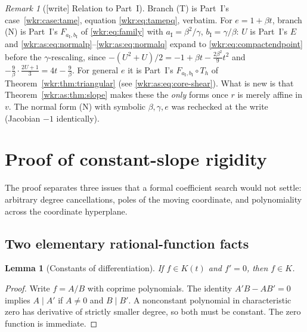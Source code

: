 \documentclass[11pt,a4paper]{article}
\numberwithin{equation}{section}
\newtheorem{lemma}[theorem]{Lemma}
\theoremstyle{definition}
\theoremstyle{remark}
\newtheorem{remark}[theorem]{Remark}
\begin{document}
\begin{remark}[\textup{[write]} Relation to Part~I]\label{wkr:as:rem:partI}
Branch (T) is Part~I's case~\ref{wkr:case:tame}, equation
\eqref{wkr:eq:tamepq}, verbatim. For $e=1+\beta t$, branch (N) is Part~I's
$F_{a_{\mathrm I},b_{\mathrm I}}$ of \eqref{wkr:eq:family} with
$a_{\mathrm I}=\beta^2/\gamma$, $b_{\mathrm I}=\gamma/\beta$: $U$ is
Part~I's $E$ and \eqref{wkr:as:eq:normalp}--\eqref{wkr:as:eq:normalq}
expand to \eqref{wkr:eq:compactendpoint} before the $\gamma$-rescaling,
since $-(U^2+U)/2=-1+\beta t-\tfrac{2\beta^2}{9}t^2$ and
$-\tfrac9\beta\cdot\tfrac{2U+1}{3}=4t-\tfrac9\beta$. For general $e$ it is
Part~I's $F_{a_{\mathrm I},b_{\mathrm I}}\circ T_h$ of
Theorem~\ref{wkr:thm:triangular} (see \eqref{wkr:as:eq:core-shear}). What
is new is that Theorem~\ref{wkr:as:thm:slope} makes these the \emph{only}
forms once $r$ is merely affine in $v$. The normal form (N) with symbolic
$\beta,\gamma,e$ was rechecked at the write (Jacobian $-1$ identically).
\end{remark}

\section{Proof of constant-slope rigidity}
\label{wkr:as:sec:rigidity}

The proof separates three issues that a formal coefficient search would
not settle: arbitrary degree cancellations, poles of the moving
coordinate, and polynomiality across the coordinate hyperplane.

\subsection{Two elementary rational-function facts}

\begin{lemma}[Constants of differentiation]\label{wkr:as:lem:constants}
If $f\in K(t)$ and $f'=0$, then $f\in K$.
\end{lemma}
\begin{proof}
Write $f=A/B$ with coprime polynomials. The identity $A'B-AB'=0$ implies
$A\mid A'$ if $A\ne0$ and $B\mid B'$. A nonconstant polynomial in
characteristic zero has derivative of strictly smaller degree, so both
must be constant. The zero function is immediate.
\end{proof}
\end{document}
